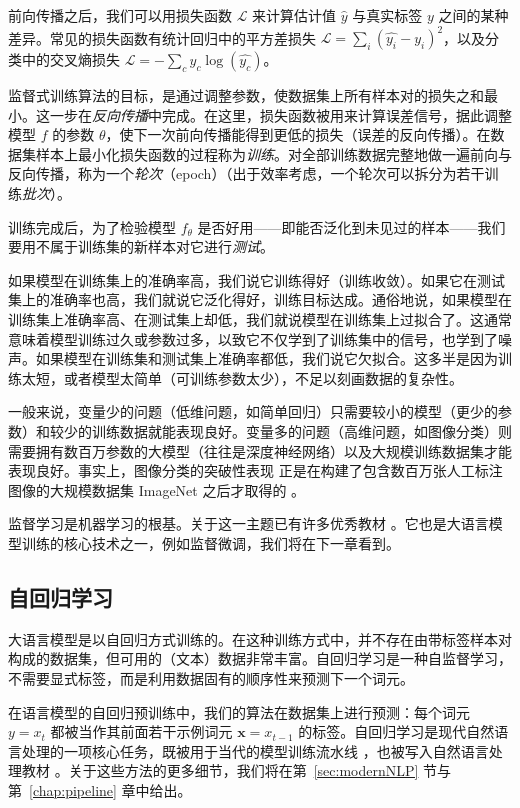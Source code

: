 前向传播之后，我们可以用损失函数 $\mathcal{L}$ 来计算估计值 $\hat{y}$ 与真实标签 $y$ 之间的某种差异。常见的损失函数有统计回归中的平方差损失 $\mathcal{L} = \sum_i(\hat{y_i} - y_i)^2$，以及分类中的交叉熵损失 $\mathcal{L} = -\sum_cy_c\log(\hat{y_c})$。
 
监督式训练算法的目标，是通过调整参数，使数据集上所有样本对的损失之和最小。这一步在{\em 反向传播}中完成。在这里，损失函数被用来计算误差信号，据此调整模型 $f$ 的参数 $\theta$，使下一次前向传播能得到更低的损失（误差的反向传播）。在数据集样本上最小化损失函数的过程称为\emph{训练}。对全部训练数据完整地做一遍前向与反向传播，称为一个\textit{轮次}（epoch）（出于效率考虑，一个轮次可以拆分为若干训练\textit{批次}）。

训练完成后，为了检验模型 $f_\theta$ 是否好用——即能否泛化到未见过的样本——我们要用不属于训练集的新样本对它进行\textit{测试}。

如果模型在训练集上的准确率高，我们说它训练得好（训练收敛）。如果它在测试集上的准确率也高，我们就说它泛化得好，训练目标达成。通俗地说，如果模型在训练集上准确率高、在测试集上却低，我们就说模型在训练集上过拟合了。这通常意味着模型训练过久或参数过多，以致它不仅学到了训练集中的信号，也学到了噪声。如果模型在训练集和测试集上准确率都低，我们说它欠拟合。这多半是因为训练太短，或者模型太简单（可训练参数太少），不足以刻画数据的复杂性。

一般来说，变量少的问题（低维问题，如简单回归）只需要较小的模型（更少的参数）和较少的训练数据就能表现良好。变量多的问题（高维问题，如图像分类）则需要拥有数百万参数的大模型（往往是深度神经网络）以及大规模训练数据集才能表现良好。事实上，图像分类的突破性表现 \citep{krizhevsky2012imagenet} 正是在构建了包含数百万张人工标注图像的大规模数据集 ImageNet 之后才取得的 \citep{deng2009imagenet}。

监督学习是机器学习的根基。关于这一主题已有许多优秀教材 \citep{bishop2023deep,goodfellow2016deep}。它也是大语言模型训练的核心技术之一，例如监督微调，我们将在下一章看到。

\subsection{自回归学习} 
大语言模型是以自回归方式训练的。在这种训练方式中，并不存在由带标签样本对构成的数据集，但可用的（文本）数据非常丰富。自回归学习是一种自监督学习，不需要显式标签，而是利用数据固有的顺序性来预测下一个词元。

在语言模型的自回归预训练中，我们的算法在数据集上进行预测：每个词元 $y=x_t$ 都被当作其前面若干示例词元 $\mathbf{x}=x_{t-1}$ 的标签。自回归学习是现代自然语言处理的一项核心任务，既被用于当代的模型训练流水线 \citep{radford2018improving}，也被写入自然语言处理教材 \citep{jm3}。关于这些方法的更多细节，我们将在第~\ref{sec:modernNLP} 节与第~\ref{chap:pipeline} 章中给出。

